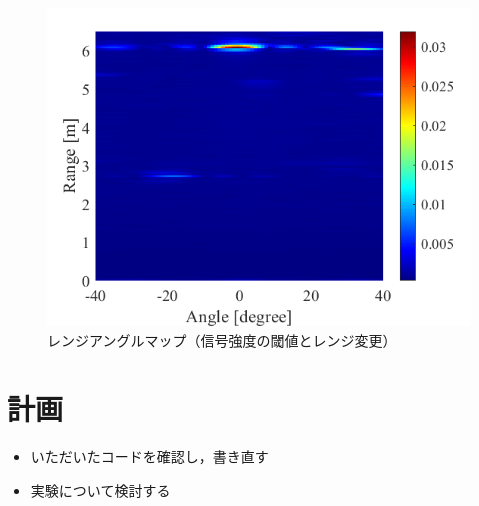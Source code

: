 \documentclass[dvipdfmx]{jsarticle}
\begin{document}
\begin{figure}[H]
\begin{center}
\includegraphics[width=0.8\linewidth]{./img/range_doppler_sample2.png}
\end{center}
\caption{レンジアングルマップ（信号強度の閾値とレンジ変更）}
\end{figure}
\section{計画}
\begin{itemize}
    \item いただいたコードを確認し，書き直す
    \item 実験について検討する
\end{itemize}
\end{document}
